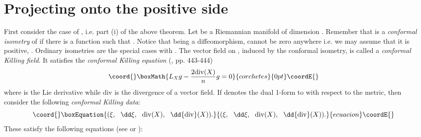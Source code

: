 \documentclass[a4paper,12pt,draft]{article}
\begin{document}
\section{Projecting onto the positive side}

First consider the case of \coordHE{}, i.e. part (i) of the above theorem. Let 
\coordHE{} be a Riemannian manifold of dimension \coordHE{}. Remember that \coordHE{} is a {\it conformal isometry} of
\coordHE{} if there is a function \coordHE{} such that
\coordHE{}. Notice that being \myHighlight{$\psi$}\coordHE{} a diffeomorphism, \coordHE{} cannot be
zero anywhere i.e. we may assume that it is positive, \coordHE{}. Ordinary
isometries are the special cases with \coordHE{}. The
vector field \coordHE{} on \coordHE{}, induced by the conformal isometry, is
called a {\it conformal Killing field}. It satisfies the {\it conformal
Killing equation} (\cite{wal}, pp. 443-444) 
\[\coord{}\boxMath{L_Xg-{2{\rm div}(X)\over n}g=0}{corchetes}{0pt}\coordE{}\]
where \coordHE{} is the Lie derivative while div is the divergence of a
vector field. If \coordHE{} denotes the dual 1-form
to \coordHE{} with respect to the metric, then consider the following {\it
conformal Killing data}:
\begin{equation}\coord{}\boxEquation{
(\xi ,\:\:\:\dd\xi ,\:\:\:{\rm div}(X),\:\:\: \dd {\rm div}(X)).
\label{adatok}
}{
(\xi ,\:\:\:\dd\xi ,\:\:\:{\rm div}(X),\:\:\: \dd {\rm div}(X)).
}{ecuacion}\coordE{}\end{equation}
These satisfy the following equations (see \cite{gar} or \cite{ger}):
\end{document}
